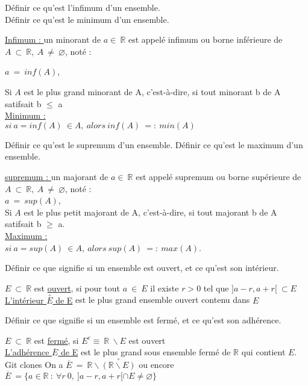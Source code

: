 \documentclass[12pt]{article}
\newcommand*{\xfield}[1]{\begin{mdframed}\centering #1\end{mdframed}\bigskip}
\newenvironment{note}{}{}
\begin{document}
\begin{note}
    \xfield{
        Définir ce qu'est l'infimum d'un ensemble.\\
        Définir ce qu'est le minimum d'un ensemble.\\
    }
    \xfield{
        \underline{Infimum : } un minorant de $a \in\ \mathbb{R}$ est appelé infimum ou borne inférieure de $A\ \subset\ \mathbb{R},\ A\ \neq\ \varnothing$, noté :\\        
        \begin{center}
              $a\ =\ inf(A)$,\\
        \end{center}
        Si $A$ est le plus grand minorant de A, c'est-à-dire, si tout minorant b de A satifsait b $\le$ a\\    
        \underline{Minimum : }\\
        $si\ a=inf(A)\ \in A,\ alors\ inf(A)\ =:\ min(A)$ }
\end{note}

\begin{note}
    \xfield{
        Définir ce qu'est le supremum d'un ensemble.
        Définir ce qu'est le maximum d'un ensemble.
    }
    \xfield{
        \underline{supremum : } un majorant de $a \in\ \mathbb{R}$ est appelé supremum ou borne supérieure de $A\ \subset\ \mathbb{R},\ A\ \neq\ \varnothing$, noté : \\
                $a\ =\ sup(A)$,\\
        Si $A$ est le plus petit majorant de A, c'est-à-dire, si tout majorant b de A satifsait b $\ge$ a.\\        
        \underline{Maximum : }\\
        $si\ a=sup(A)\ \in A,\ alors\ sup(A)\ =:\ max(A)$.
    }
\end{note}

\begin{note}
    \xfield{Définir ce que signifie si un ensemble est ouvert, et ce qu'est son intérieur.}
    \xfield{
        $E\ \subset\ \mathbb{R}$ est \underline{ouvert}, si pour tout $a\ \in\ E$ il existe $r >0$ tel que $] a-r, a+r [\ \subset E$\\
                \underline{L'intérieur $\overset{\circ}{E}$ de E} est le plus grand ensemble ouvert contenu dans $E$
    }
\end{note}

\begin{note}
    \xfield{
        Définir ce que signifie si un ensemble est fermé, et ce qu'est son adhérence.
    }
    \xfield{
        $E\ \subset\ \mathbb{R}$ est \underline{fermé}, si $E^c \equiv\ \mathbb{R}\ \backslash E$ est ouvert\\
        \underline{L'adhérence $\overline{E}$ de E} est le plus grand sous ensemble fermé de $\mathbb{R}$ qui contient $E$. \\Git clones
        On a $\overline{E}\ =\ \mathbb{R}\backslash \overset{\circ}{(\mathbb{R}\backslash E)}$ ou encore $\overline{E}\ = \{ a \in \mathbb{R}\ :\ \forall r \> 0,\ ] a-r, a+r[ \cap E \neq \varnothing\} $
    }
\end{note}
\end{document}
